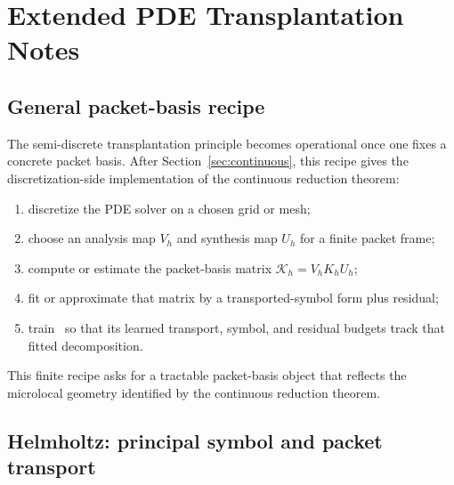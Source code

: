 \section{Extended PDE Transplantation Notes}
\label{app:pde}

\subsection{General packet-basis recipe}

The semi-discrete transplantation principle becomes operational once one fixes a concrete packet basis. After Section~\ref{sec:continuous}, this recipe gives the discretization-side implementation of the continuous reduction theorem:
\begin{enumerate}
\item discretize the PDE solver on a chosen grid or mesh;
\item choose an analysis map $V_h$ and synthesis map $U_h$ for a finite packet frame;
\item compute or estimate the packet-basis matrix $\mathcal K_h=V_hK_hU_h$;
\item fit or approximate that matrix by a transported-symbol form plus residual;
\item train \MiNO\ so that its learned transport, symbol, and residual budgets track that fitted decomposition.
\end{enumerate}
This finite recipe asks for a tractable packet-basis object that reflects the microlocal geometry identified by the continuous reduction theorem.

\subsection{Helmholtz: principal symbol and packet transport}

